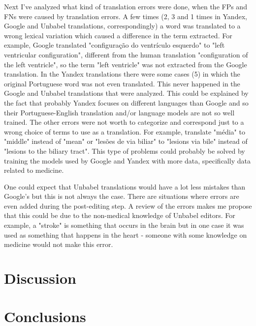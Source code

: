 Next I've analyzed what kind of translation errors were done, when the FPs and FNs were caused by translation errors. A few times (2, 3 and 1 times in Yandex, Google and Unbabel translations, correspondingly) a word was translated to a wrong lexical variation which caused a difference in the term extracted. For example, Google translated "configuração do ventrículo esquerdo" to "left ventricular configuration", different from the human translation "configuration of the left ventricle", so the term "left ventricle" was not extracted from the Google translation. In the Yandex translations there were some cases (5) in which the original Portuguese word was not even translated. This never happened in the Google and Unbabel translations that were analyzed. This could be explained by the fact that probably Yandex focuses on different languages than Google and so their Portuguese-English translation and/or language models are not so well trained. The other errors were not worth to categorize and correspond just to a wrong  choice of terms to use as a translation. For example, translate "média" to "middle" instead of "mean" or "lesões de via biliar" to "lesions via bile" instead of "lesions to the biliary tract". This type of problems could probably be solved by training the models used by Google and Yandex with more data, specifically data related to medicine.

One could expect that Unbabel translations would have a lot less mistakes than Google's but this is not always the case. There are situations where errors are even added during the post-editing step. A review of the errors makes me propose that this could be due to the non-medical knowledge of Unbabel editors. For example, a "stroke" is something that occurs in the brain but in one case it was used as something that happens in the heart - someone with some knowledge on medicine would not make this error.


\section{Discussion}





\section{Conclusions}




  
